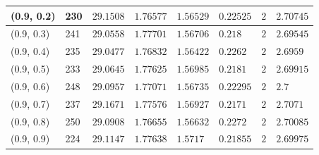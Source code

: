 \begin{center}
{\begin{longtable}{| l | p{} |  p{} | p{} | p{} | p{} | p{} | p{} |}
 (0.9, 0.2) & 230  & $29.1508$ & $1.76577$ & $1.56529$ & $0.22525$ & $2$ & $2.70745$ \\ \hline
 (0.9, 0.3) & 241  & $29.0558$ & $1.77701$ & $1.56706$ & $0.218$ & $2$ & $2.69545$ \\ \hline
 (0.9, 0.4) & 235  & $29.0477$ & $1.76832$ & $1.56422$ & $0.2262$ & $2$ & $2.6959$ \\ \hline
 (0.9, 0.5) & 233  & $29.0645$ & $1.77625$ & $1.56985$ & $0.2181$ & $2$ & $2.69915$ \\ \hline
 (0.9, 0.6) & 248  & $29.0957$ & $1.77071$ & $1.56735$ & $0.22295$ & $2$ & $2.7$ \\ \hline
 (0.9, 0.7) & 237  & $29.1671$ & $1.77576$ & $1.56927$ & $0.2171$ & $2$ & $2.7071$ \\ \hline
 (0.9, 0.8) & 250  & $29.0908$ & $1.76655$ & $1.56632$ & $0.2272$ & $2$ & $2.70085$ \\ \hline
 (0.9, 0.9) & 224  & $29.1147$ & $1.77638$ & $1.5717$ & $0.21855$ & $2$ & $2.69975$ \\ \hline
\end{longtable}

}
\end{center}
